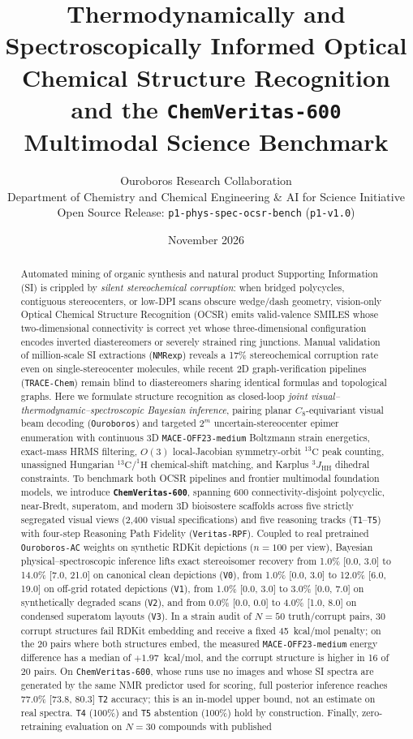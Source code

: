\documentclass[10pt,twocolumn]{article}
\title{\textbf{Thermodynamically and Spectroscopically Informed Optical Chemical Structure Recognition and the \texttt{ChemVeritas-600} Multimodal Science Benchmark}}
\author{
  Ouroboros Research Collaboration\\
  \small Department of Chemistry and Chemical Engineering \& AI for Science Initiative\\
  \small Open Source Release: \texttt{p1-phys-spec-ocsr-bench} (\texttt{p1-v1.0})
}
\date{November 2026}
\begin{document}
\maketitle

\begin{abstract}
Automated mining of organic synthesis and natural product Supporting Information (SI) is crippled by \emph{silent stereochemical corruption}: when bridged polycycles, contiguous stereocenters, or low-DPI scans obscure wedge/dash geometry, vision-only Optical Chemical Structure Recognition (OCSR) emits valid-valence SMILES whose two-dimensional connectivity is correct yet whose three-dimensional configuration encodes inverted diastereomers or severely strained ring junctions. Manual validation of million-scale SI extractions (\texttt{NMRexp}) reveals a 17\% stereochemical corruption rate even on single-stereocenter molecules, while recent 2D graph-verification pipelines (\texttt{TRACE-Chem}) remain blind to diastereomers sharing identical formulas and topological graphs. Here we formulate structure recognition as closed-loop \emph{joint visual--thermodynamic--spectroscopic Bayesian inference}, pairing planar $C_8$-equivariant visual beam decoding (\texttt{Ouroboros}) and targeted $2^m$ uncertain-stereocenter epimer enumeration with continuous 3D \texttt{MACE-OFF23-medium} Boltzmann strain energetics, exact-mass HRMS filtering, $O(3)$ local-Jacobian symmetry-orbit $^{13}\text{C}$ peak counting, unassigned Hungarian $^{13}\text{C}/^{1}\text{H}$ chemical-shift matching, and Karplus $^3J_{\text{HH}}$ dihedral constraints. To benchmark both OCSR pipelines and frontier multimodal foundation models, we introduce \textbf{\texttt{ChemVeritas-600}}, spanning 600 connectivity-disjoint polycyclic, near-Bredt, superatom, and modern 3D bioisostere scaffolds across five strictly segregated visual views (2,400 visual specifications) and five reasoning tracks (\texttt{T1}--\texttt{T5}) with four-step Reasoning Path Fidelity (\texttt{Veritas-RPF}). Coupled to real pretrained \texttt{Ouroboros-AC} weights on synthetic RDKit depictions ($n=100$ per view), Bayesian physical--spectroscopic inference lifts exact stereoisomer recovery from 1.0\% [0.0, 3.0] to 14.0\% [7.0, 21.0] on canonical clean depictions (\texttt{V0}), from 1.0\% [0.0, 3.0] to 12.0\% [6.0, 19.0] on off-grid rotated depictions (\texttt{V1}), from 1.0\% [0.0, 3.0] to 3.0\% [0.0, 7.0] on synthetically degraded scans (\texttt{V2}), and from 0.0\% [0.0, 0.0] to 4.0\% [1.0, 8.0] on condensed superatom layouts (\texttt{V3}). In a strain audit of $N=50$ truth/corrupt pairs, 30 corrupt structures fail RDKit embedding and receive a fixed 45~kcal/mol penalty; on the 20 pairs where both structures embed, the measured \texttt{MACE-OFF23-medium} energy difference has a median of $+1.97$~kcal/mol, and the corrupt structure is higher in 16 of 20 pairs. On \texttt{ChemVeritas-600}, whose runs use no images and whose SI spectra are generated by the same NMR predictor used for scoring, full posterior inference reaches 77.0\% [73.8, 80.3] \texttt{T2} accuracy; this is an in-model upper bound, not an estimate on real spectra. \texttt{T4} (100\%) and \texttt{T5} abstention (100\%) hold by construction. Finally, zero-retraining evaluation on $N=30$ compounds with published 
\end{abstract}
\end{document}
